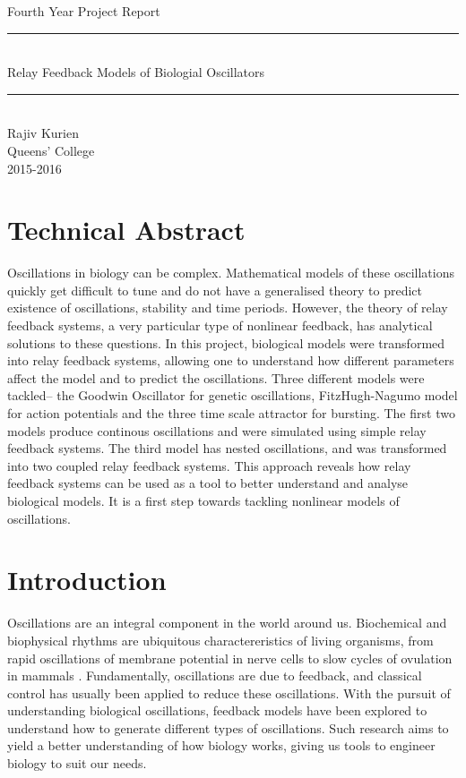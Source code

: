 \documentclass[a4paper, 12pt]{article}
\begin{document}
\begin{titlepage}
 \vspace*{\fill}
	\begin{center}
		{\Large Fourth Year Project Report} \vspace{0.25cm}
		\rule{\textwidth}{.1pt} \\[0.25cm]
		{\Huge Relay Feedback Models of Biologial Oscillators}\\%
		\vspace{0.25cm} 
		\rule{\textwidth}{.1pt} \\[0.5cm]
		\Large{
	Rajiv Kurien\\Queens' College\\2015-2016
		}
	\end{center}
 \vspace*{\fill}
\end{titlepage}
\section*{Technical Abstract}
Oscillations in biology can be complex. Mathematical models of these oscillations quickly get difficult to tune and do not have a generalised theory to predict existence of oscillations, stability and time periods. However, the theory of relay feedback systems, a very particular type of nonlinear feedback, has analytical solutions to these questions. In this project, biological models were transformed into relay feedback systems, allowing one to understand how different parameters affect the model and to predict the oscillations. Three different models were tackled-- the Goodwin Oscillator for genetic oscillations, FitzHugh-Nagumo model for action potentials and the three time scale attractor for bursting. The first two models produce continous oscillations and were simulated using simple relay feedback systems. The third model has nested oscillations, and was transformed into two coupled relay feedback systems. This approach reveals how relay feedback systems can be used as a tool to better understand and analyse biological models. It is a first step towards tackling nonlinear models of oscillations.
\newpage
\tableofcontents
\newpage
\section{Introduction}
Oscillations are an integral component in the world around us. Biochemical and biophysical rhythms are ubiquitous charactereristics of living organisms, from rapid oscillations of membrane potential in nerve cells to slow cycles of ovulation in mammals \cite{fall}. Fundamentally, oscillations are due to feedback,  and classical control has usually been applied to reduce these oscillations. With the pursuit of understanding biological oscillations, feedback models have been explored to understand how to generate different types of oscillations. Such research aims to yield a better understanding of how biology works, giving us tools to engineer biology to suit our needs. 
\end{document}
